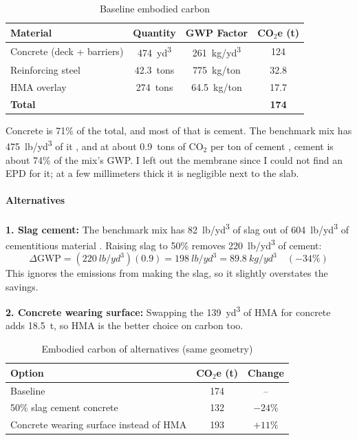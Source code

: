 \documentclass[11pt]{article}
\begin{document}
\begin{table}[H]
    \centering
    \caption{Baseline embodied carbon}
    \label{tab:carbon}
    \begin{tabular}{lccc}
        \toprule
        \textbf{Material} & \textbf{Quantity} & \textbf{GWP Factor} & \textbf{CO$_2$e (t)} \\
        \midrule
        Concrete (deck + barriers) & \SI{474}{yd^3} & \SI{261}{kg/yd^3} & 124 \\
        Reinforcing steel & \SI{42.3}{tons} & \SI{775}{kg/ton} & 32.8 \\
        HMA overlay & \SI{274}{tons} & \SI{64.5}{kg/ton} & 17.7 \\
        \midrule
        \textbf{Total} & & & \textbf{174} \\
        \bottomrule
    \end{tabular}
\end{table}

Concrete is 71\% of the total, and most of that is cement. The benchmark mix has \SI{475}{lb/yd^3} of it \cite{nrmca}, and at about \SI{0.9}{tons} of CO$_2$ per ton of cement \cite{sca}, cement is about 74\% of the mix's GWP. I left out the membrane since I could not find an EPD for it; at a few millimeters thick it is negligible next to the slab.

\paragraph{Alternatives}
\textbf{1. Slag cement:} The benchmark mix has \SI{82}{lb/yd^3} of slag out of \SI{604}{lb/yd^3} of cementitious material \cite{nrmca}. Raising slag to 50\% removes \SI{220}{lb/yd^3} of cement:
\[
\Delta\text{GWP} = (\SI{220}{lb/yd^3})(0.9) = \SI{198}{lb/yd^3} = \SI{89.8}{kg/yd^3} \quad (-34\%)
\]
This ignores the emissions from making the slag, so it slightly overstates the savings.

\textbf{2. Concrete wearing surface:} Swapping the \SI{139}{yd^3} of HMA for concrete adds \SI{18.5}{t}, so HMA is the better choice on carbon too.

\begin{table}[H]
    \centering
    \caption{Embodied carbon of alternatives (same geometry)}
    \label{tab:alts}
    \begin{tabular}{lcc}
        \toprule
        \textbf{Option} & \textbf{CO$_2$e (t)} & \textbf{Change} \\
        \midrule
        Baseline & 174 & -- \\
        50\% slag cement concrete & 132 & $-24\%$ \\
        Concrete wearing surface instead of HMA & 193 & $+11\%$ \\
        \bottomrule
    \end{tabular}
\end{table}
\end{document}
